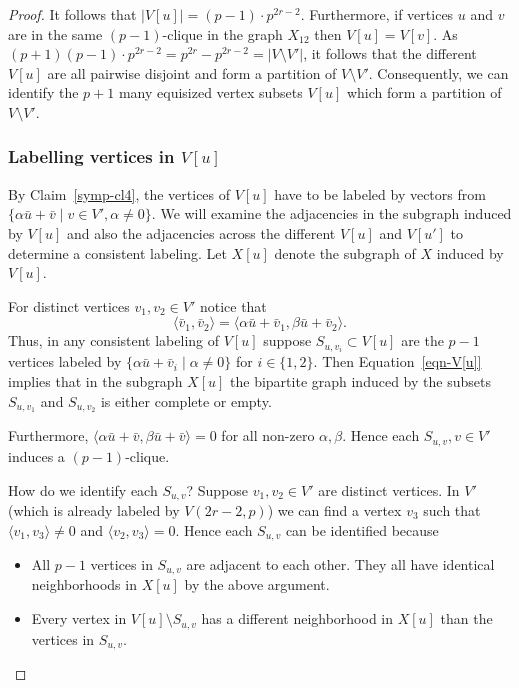 \documentclass{elsarticle}
\newcommand{\sympl}[1]{\langle #1 \rangle}
\begin{document}
\begin{proof}
It follows that $|V[u]|=(p-1)\cdot p^{2r-2}$. Furthermore, if vertices
$u$ and $v$ are in the same $(p-1)$-clique in the graph $X_{12}$ then
$V[u]=V[v]$. As
$(p+1)(p-1)\cdot p^{2r-2}=p^{2r}-p^{2r-2}=|V\setminus V'|$, it follows
that the different $V[u]$ are all pairwise disjoint and form a
partition of $V\setminus V'$. Consequently, we can identify the $p+1$
many equisized vertex subsets $V[u]$ which form a partition of
$V\setminus V'$.

\subsubsection*{Labelling vertices in $V[u]$}

By Claim~\ref{symp-cl4}, the vertices of $V[u]$ have to be labeled by
vectors from $\{\alpha\bar{u}+\bar{v}\mid v\in V', \alpha\ne 0\}$.  We
will examine the adjacencies in the subgraph induced by $V[u]$ and
also the adjacencies across the different $V[u]$ and $V[u']$ to
determine a consistent labeling. Let $X[u]$ denote the subgraph of $X$
induced by $V[u]$.

For distinct vertices $v_1, v_2\in V'$ notice that
\begin{equation}\label{eqn-V[u]}
  \sympl{\bar{v}_1,\bar{v}_2} =\sympl{\alpha \bar{u}+\bar{v}_1,\beta
    \bar{u}+\bar{v}_2}.
\end{equation}
Thus, in any consistent labeling of $V[u]$ suppose
$S_{u,v_i}\subset V[u]$ are the $p-1$ vertices labeled by
$\{\alpha\bar{u}+\bar{v}_i\mid \alpha \ne 0\}$ for $i\in\{1,2\}$. Then
Equation~\ref{eqn-V[u]} implies that in the subgraph $X[u]$ the
bipartite graph induced by the subsets $S_{u,v_1}$ and $S_{u,v_2}$
is either complete or empty.

Furthermore, $\sympl{\alpha\bar{u}+\bar{v},\beta\bar{u}+\bar{v}}=0$
for all non-zero $\alpha,\beta$. Hence each $S_{u,v}, v\in V'$ induces
a $(p-1)$-clique.

How do we identify each $S_{u,v}$? Suppose $v_1,v_2\in V'$ are
distinct vertices. In $V'$ (which is already labeled by $V(2r-2,p)$)
we can find a vertex $v_3$ such that $\sympl{v_1,v_3}\ne 0$ and
$\sympl{v_2,v_3}=0$. Hence each $S_{u,v}$ can be identified because
\begin{itemize}
\item All $p-1$ vertices in $S_{u,v}$ are adjacent to each other. They
  all have identical neighborhoods in $X[u]$ by the above argument.
\item Every vertex in $V[u]\setminus S_{u,v}$ has a different
  neighborhood in $X[u]$ than the vertices in $S_{u,v}$.
\end{itemize}


\end{proof}
\end{document}

